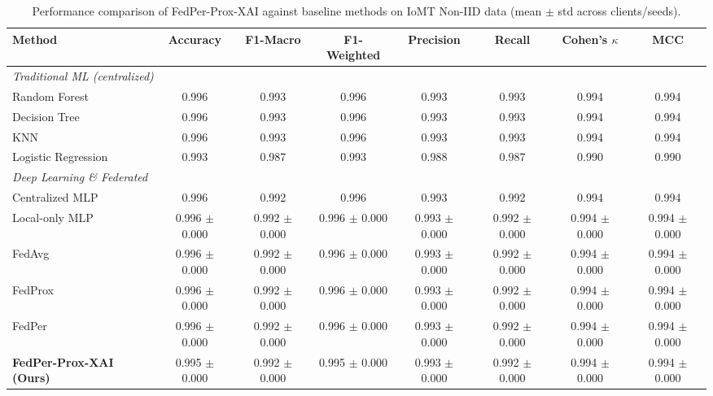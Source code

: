 \begin{table}[t]
\centering
\caption{Performance comparison of FedPer-Prox-XAI against baseline methods on IoMT Non-IID data (mean $\pm$ std across clients/seeds).}
\label{tab:sota_comparison}
\begin{tabular}{lccccccc}
\toprule
Method & Accuracy & F1-Macro & F1-Weighted & Precision & Recall & Cohen's $\kappa$ & MCC \\
\midrule
\multicolumn{8}{l}{\textit{Traditional ML (centralized)}} \\
Random Forest & 0.996 & 0.993 & 0.996 & 0.993 & 0.993 & 0.994 & 0.994 \\
Decision Tree & 0.996 & 0.993 & 0.996 & 0.993 & 0.993 & 0.994 & 0.994 \\
KNN & 0.996 & 0.993 & 0.996 & 0.993 & 0.993 & 0.994 & 0.994 \\
Logistic Regression & 0.993 & 0.987 & 0.993 & 0.988 & 0.987 & 0.990 & 0.990 \\
\midrule
\multicolumn{8}{l}{\textit{Deep Learning \& Federated}} \\
Centralized MLP & 0.996 & 0.992 & 0.996 & 0.993 & 0.992 & 0.994 & 0.994 \\
Local-only MLP & 0.996 $\pm$ 0.000 & 0.992 $\pm$ 0.000 & 0.996 $\pm$ 0.000 & 0.993 $\pm$ 0.000 & 0.992 $\pm$ 0.000 & 0.994 $\pm$ 0.000 & 0.994 $\pm$ 0.000 \\
FedAvg & 0.996 $\pm$ 0.000 & 0.992 $\pm$ 0.000 & 0.996 $\pm$ 0.000 & 0.993 $\pm$ 0.000 & 0.992 $\pm$ 0.000 & 0.994 $\pm$ 0.000 & 0.994 $\pm$ 0.000 \\
FedProx & 0.996 $\pm$ 0.000 & 0.992 $\pm$ 0.000 & 0.996 $\pm$ 0.000 & 0.993 $\pm$ 0.000 & 0.992 $\pm$ 0.000 & 0.994 $\pm$ 0.000 & 0.994 $\pm$ 0.000 \\
FedPer & 0.996 $\pm$ 0.000 & 0.992 $\pm$ 0.000 & 0.996 $\pm$ 0.000 & 0.993 $\pm$ 0.000 & 0.992 $\pm$ 0.000 & 0.994 $\pm$ 0.000 & 0.994 $\pm$ 0.000 \\
\textbf{FedPer-Prox-XAI (Ours)} & 0.995 $\pm$ 0.000 & 0.992 $\pm$ 0.000 & 0.995 $\pm$ 0.000 & 0.993 $\pm$ 0.000 & 0.992 $\pm$ 0.000 & 0.994 $\pm$ 0.000 & 0.994 $\pm$ 0.000 \\
\bottomrule
\end{tabular}
\end{table}
